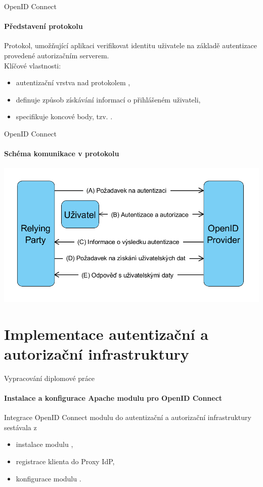 \documentclass[
]{beamer}
\begin{document}
\begin{frame}{OpenID Connect}
\framesubtitle{Představení protokolu}
Protokol, umožňující aplikaci verifikovat identitu uživatele na základě autentizace provedené autorizačním serverem.
\\
\medskip
Klíčové vlastnosti:
\begin{itemize}
  \item autentizační vrstva nad protokolem  \cite{rfc6749},
  \item definuje způsob získávání informací o přihlášeném uživateli,
  \item specifikuje koncové body, tzv. .
\end{itemize}
\end{frame}

\begin{frame}{OpenID Connect}
\framesubtitle{Schéma komunikace v protokolu}
\includegraphics[width=\textwidth]{pics/diplomkaOIDC}
\end{frame}


\section[Implementace autentizační a autorizační infrastruktury]{Implementace autentizační a autorizační infrastruktury}

\begin{frame}{Vypracování diplomové práce}
\framesubtitle{Instalace a konfigurace Apache modulu pro OpenID Connect \cite{oidcConfigPresentation}}
Integrace OpenID Connect modulu do autentizační a autorizační infrastruktury sestávala z
\begin{itemize}
    \item instalace modulu ,
    \item registrace klienta do Proxy IdP,
    \item konfigurace modulu .
\end{itemize}
\end{frame}
\end{document}
